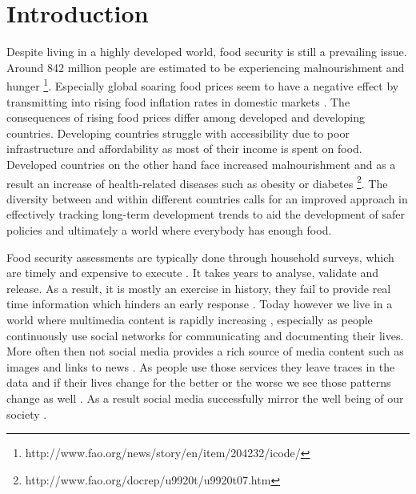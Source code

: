 

\let\cleardoublepage\clearpage


\chapter{Introduction}

Despite living in a highly developed world, food security is still a prevailing issue. Around 842 million people are estimated to be experiencing malnourishment and hunger \footnote{http://www.fao.org/news/story/en/item/204232/icode/}. Especially global soaring food prices seem to have a negative effect by transmitting into rising food inflation rates in domestic markets \cite{Tadesse2014}. The consequences of rising food prices differ among developed and developing countries. Developing countries struggle with accessibility due to poor infrastructure and affordability as most of their income is spent on food. Developed countries on the other hand face increased malnourishment and as a result an increase of health-related diseases such as obesity or diabetes \footnote{http://www.fao.org/docrep/u9920t/u9920t07.htm}.  The diversity between and within different countries calls for an improved approach in effectively tracking long-term development trends to aid the development of safer policies and ultimately a world where everybody has enough food. 

Food security assessments are typically done through household surveys, which are timely and expensive to execute \cite{deCastro91}. It takes years to analyse, validate and release. As a result, it is mostly an exercise in history, they fail to provide real time information which hinders an early response \cite{ungp2013}. Today however we live in a world where multimedia content is rapidly increasing \cite{twitter13}, especially as people continuously use social networks for communicating and documenting their lives. More often then not social media provides a rich source of media content such as images and links to news \cite{twitter13}. As people use those services they leave traces in the data and if their lives change for the better or the worse we see those patterns change as well \cite{adeline14}. As a result social media successfully mirror the well being of our society \cite{van2012conversation}. 

